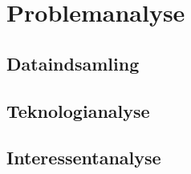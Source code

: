 \chapter{Problemanalyse}
\label{sec:problemanalyse}


\section{Dataindsamling}




\clearpage

\section{Teknologianalyse}




\clearpage

\section{Interessentanalyse}

